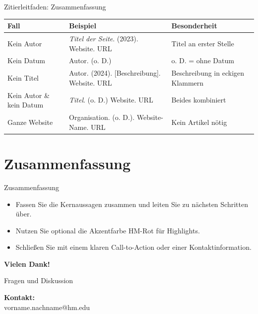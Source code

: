 \documentclass[aspectratio=169,10pt]{beamer}
\begin{document}
\begin{frame}{Zitierleitfaden: Zusammenfassung}
\small
\begin{table}
  \centering
  \begin{tabular}{>{\raggedright\arraybackslash}p{} >{\raggedright\arraybackslash}p{} >{\raggedright\arraybackslash}p{}}
    \toprule
    \textbf{Fall} & \textbf{Beispiel} & \textbf{Besonderheit} \\
    \midrule
    Kein Autor & \textit{Titel der Seite}. (2023). Website. URL & Titel an erster Stelle \\
    Kein Datum & Autor. (o. D.) & o. D. = ohne Datum \\
    Kein Titel & Autor. (2024). {[}Beschreibung{]}. Website. URL & Beschreibung in eckigen Klammern \\
    Kein Autor \& kein Datum & \textit{Titel}. (o. D.) Website. URL & Beides kombiniert \\
    Ganze Website & Organisation. (o. D.). Website-Name. URL & Kein Artikel nötig \\
    \bottomrule
  \end{tabular}
\end{table}
\end{frame}

\section{Zusammenfassung}
\begin{frame}{Zusammenfassung}
\begin{itemize}
  \item Fassen Sie die Kernaussagen zusammen und leiten Sie zu nächsten Schritten über.
  \item Nutzen Sie optional die Akzentfarbe \textcolor{HMRed}{HM-Rot} für Highlights.
  \item Schließen Sie mit einem klaren Call-to-Action oder einer Kontaktinformation.
\end{itemize}
\end{frame}

\begin{frame}[plain]
\begin{center}
  \vspace{2cm}
  {\Huge \textbf{Vielen Dank!}}
  
  \vspace{1cm}
  {\Large Fragen und Diskussion}
  
  \vspace{1.5cm}
  \textbf{Kontakt:}\\
  vorname.nachname@hm.edu
\end{center}
\end{frame}
\end{document}

